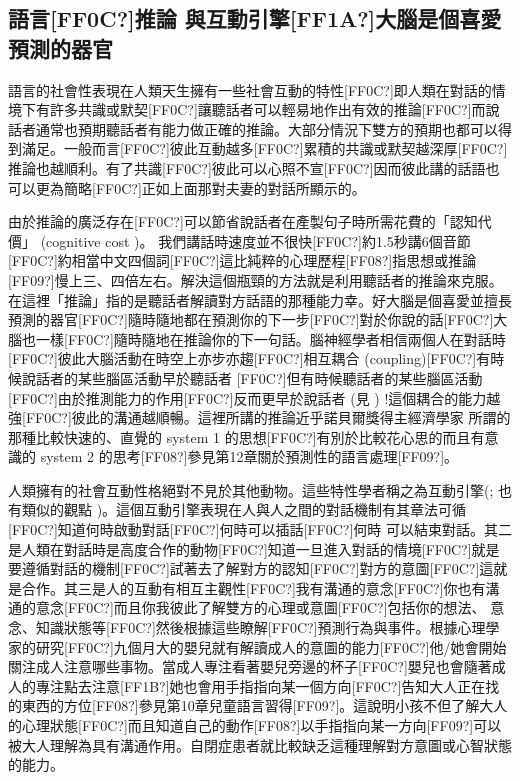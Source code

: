 \subsection{語言[FF0C?]推論 與互動引擎[FF1A?]大腦是個喜愛預測的器官} %

語言的社會性表現在人類天生擁有一些社會互動的特性[FF0C?]即人類在對話的情境下有許多共識或默契[FF0C?]讓聽話者可以輕易地作出有效的推論[FF0C?]而說話者通常也預期聽話者有能力做正確的推論。大部分情況下雙方的預期也都可以得到滿足。一般而言[FF0C?]彼此互動越多[FF0C?]累積的共識或默契越深厚[FF0C?]推論也越順利。有了共識[FF0C?]彼此可以心照不宣[FF0C?]因而彼此講的話語也可以更為簡略[FF0C?]正如上面那對夫妻的對話所顯示的。

由於推論的廣泛存在[FF0C?]可以節省說話者在產製句子時所需花費的「認知代價」 (cognitive cost )。 我們講話時速度並不很快[FF0C?]約1.5秒講6個音節[FF0C?]約相當中文四個詞[FF0C?]這比純粹的心理歷程[FF08?]指思想或推論[FF09?]慢上三、四倍左右。解決這個瓶頸的方法就是利用聽話者的推論來克服。在這裡「推論」指的是聽話者解讀對方話語的那種能力幸。好大腦是個喜愛並擅長預測的器官[FF0C?]隨時隨地都在預測你的下一步[FF0C?]對於你說的話[FF0C?]大腦也一樣[FF0C?]隨時隨地在推論你的下一句話。腦神經學者相信兩個人在對話時[FF0C?]彼此大腦活動在時空上亦步亦趨[FF0C?]相互耦合 (coupling)[FF0C?]有時候說話者的某些腦區活動早於聽話者 [FF0C?]但有時候聽話者的某些腦區活動[FF0C?]由於推測能力的作用[FF0C?]反而更早於說話者 (見 \citealt{StephensEtAl2010}) !這個耦合的能力越強[FF0C?]彼此的溝通越順暢。這裡所講的推論近乎諾貝爾獎得主經濟學家\citet{Kahneman2011} 所謂的那種比較快速的、直覺的 system 1 的思想[FF0C?]有別於比較花心思的而且有意識的 system 2 的思考[FF08?]參見第12章關於預測性的語言處理[FF09?]。

人類擁有的社會互動性格絕對不見於其他動物。這些特性學者稱之為互動引擎(\citealt{EnfieldLevinson2006}; \citealt{Pagel2012} 也有類似的觀點 )。這個互動引擎表現在人與人之間的對話機制有其章法可循[FF0C?]知道何時啟動對話[FF0C?]何時可以插話[FF0C?]何時 可以結束對話。其二是人類在對話時是高度合作的動物[FF0C?]知道一旦進入對話的情境[FF0C?]就是要遵循對話的機制[FF0C?]試著去了解對方的認知[FF0C?]對方的意圖[FF0C?]這就是合作。其三是人的互動有相互主觀性[FF0C?]我有溝通的意念[FF0C?]你也有溝通的意念[FF0C?]而且你我彼此了解雙方的心理或意圖[FF0C?]包括你的想法、 意念、知識狀態等[FF0C?]然後根據這些瞭解[FF0C?]預測行為與事件。根據心理學家的研究[FF0C?]九個月大的嬰兒就有解讀成人的意圖的能力[FF0C?]他/她會開始關注成人注意哪些事物。當成人專注看著嬰兒旁邊的杯子[FF0C?]嬰兒也會隨著成人的專注點去注意[FF1B?]她也會用手指指向某一個方向[FF0C?]告知大人正在找的東西的方位[FF08?]參見第10章兒童語言習得[FF09?]。這說明小孩不但了解大人的心理狀態[FF0C?]而且知道自己的動作[FF08?]以手指指向某一方向[FF09?]可以被大人理解為具有溝通作用。自閉症患者就比較缺乏這種理解對方意圖或心智狀態的能力。


